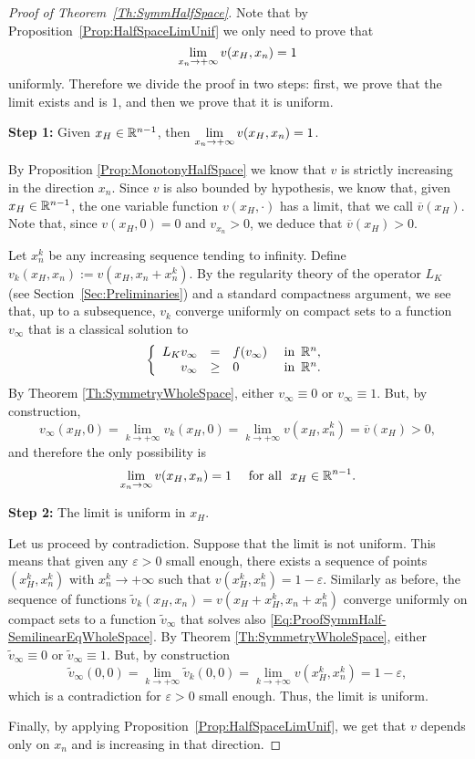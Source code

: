 \begin{proof}[Proof of Theorem~\ref{Th:SymmHalfSpace}]
Note that by Proposition~\ref{Prop:HalfSpaceLimUnif} we only need to prove that
$$
\displaystyle \lim_{x_n\to+ \infty} v(x_H,x_n) = 1
$$
uniformly. Therefore we divide the proof in two steps: first, we prove that the limit exists and is $1$, and then we prove that it is uniform.


\textbf{Step 1:} Given $x_H\in \mathbb{R}^{n-1}$, then  $\displaystyle \lim_{x_n\to +\infty} v(x_H,x_n) = 1$.

By Proposition \ref{Prop:MonotonyHalfSpace} we know that $v$ is strictly increasing in the direction $x_n$. Since $v$ is also bounded by hypothesis, we know that, given $x_H\in\mathbb{R}^{n-1}$, the one variable function $v(x_H,\cdot)$ has a limit, that we call $\overline{v}(x_H)$. Note that, since $v(x_H,0) = 0$ and $v_{x_n}>0$, we deduce that $\overline{v}(x_H) > 0$.

Let $x_n^k$ be any increasing sequence tending to infinity. Define $v_k(x_H,x_n) := v(x_H,x_n+x_n^k)$. By the regularity theory of the operator $L_K $ (see Section~\ref{Sec:Preliminaries}) and a standard compactness argument, we see that, up to a subsequence, $v_k$ converge uniformly on compact sets to a function $v_\infty$ that is a classical solution to
\begin{equation}
\label{Eq:ProofSymmHalf-SemilinearEqWholeSpace}
\left\{\begin{array}{rcll}
L_K v_\infty &=& f(v_\infty)   &\textrm{ in } \,\mathbb{R}^n,\\
v_\infty &\geq& 0   &\textrm{ in } \,\mathbb{R}^n.
\end{array} \right.
\end{equation}
By Theorem \ref{Th:SymmetryWholeSpace}, either $v_\infty\equiv 0$ or $v_\infty \equiv 1$. But, by construction,
$$ v_\infty(x_H,0) = \lim_{k\to + \infty} v_k(x_H,0) = \lim_{k\to + \infty} v(x_H,x_n^k) = \overline{v}(x_H) > 0, $$
and therefore the only possibility is
$$ \lim_{x_n\to \infty} v(x_H,x_n) = 1 \quad \text{ for all } \ x_H\in\mathbb{R}^{n-1}. $$

\textbf{Step 2:} The limit is uniform in $x_H$.

Let us proceed by contradiction. Suppose that the limit is not uniform. This means that given any $\varepsilon>0$ small enough, there exists a sequence of points $(x_H^k,x_n^k)$ with $x_n^k\to +\infty$ such that $v(x_H^k,x_n^k) = 1-\varepsilon$. Similarly as before, the sequence of functions $\tilde{v}_k(x_H,x_n) = v(x_H+x_H^k,x_n+x_n^k)$ converge uniformly on compact sets to a function $\tilde{v}_\infty$ that solves also \eqref{Eq:ProofSymmHalf-SemilinearEqWholeSpace}. By Theorem \ref{Th:SymmetryWholeSpace}, either $\tilde{v}_\infty\equiv 0$ or $\tilde{v}_\infty \equiv 1$. But, by construction
$$ 
\tilde{v}_\infty(0,0) = \lim_{k\to +\infty} \tilde{v}_k(0,0) = \lim_{k\to +\infty} v(x_H^k,x_n^k) = 1-\varepsilon, 
$$
which is a contradiction for $\varepsilon>0$ small enough. Thus, the limit is uniform.

Finally, by applying Proposition~\ref{Prop:HalfSpaceLimUnif}, we get that $v$ depends only on $x_n$ and is increasing in that direction.
\end{proof}
